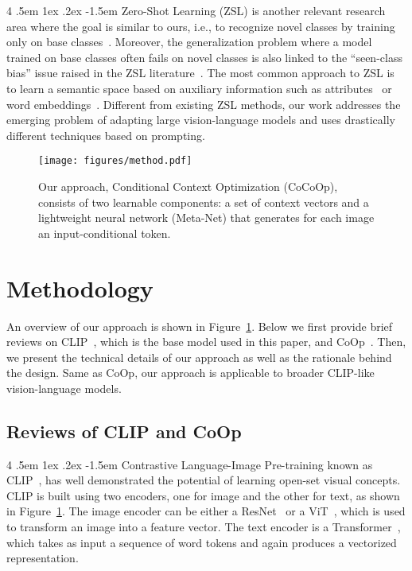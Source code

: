 \documentclass[10pt,twocolumn,letterpaper]{article}
\makeatletter
\renewcommand\paragraph{
  \@startsection{paragraph} {4} {\z@} {.5em \@plus1ex \@minus.2ex} {-1.5em} {\normalfont\normalsize\bfseries} }
\makeatother
\begin{document}
\paragraph{Zero-Shot Learning (ZSL)}
is another relevant research area where the goal is similar to ours, i.e., to recognize novel classes by training only on base classes~\cite{wang2019survey,xian2017zero,chao2016empirical,yi2022exploring}. Moreover, the generalization problem where a model trained on base classes often fails on novel classes is also linked to the ``seen-class bias'' issue raised in the ZSL literature~\cite{xian2017zero}. The most common approach to ZSL is to learn a semantic space based on auxiliary information such as attributes~\cite{huynh2020fine} or word embeddings~\cite{frome2013devise,wang2018zero}. Different from existing ZSL methods, our work addresses the emerging problem of adapting large vision-language models and uses drastically different techniques based on prompting.


\begin{figure}[t]
    \centering
    \texttt{[image: figures/method.pdf]}
    \caption{Our approach, Conditional Context Optimization (CoCoOp), consists of two learnable components: a set of context vectors and a lightweight neural network (Meta-Net) that generates for each image an input-conditional token.}
    \label{fig:method}
\end{figure}


\section{Methodology}
\label{sec:methodology}

An overview of our approach is shown in Figure~\ref{fig:method}. Below we first provide brief reviews on CLIP~\cite{radford2021learning}, which is the base model used in this paper, and CoOp~\cite{zhou2021coop}. Then, we present the technical details of our approach as well as the rationale behind the design. Same as CoOp, our approach is applicable to broader CLIP-like vision-language models.


\subsection{Reviews of CLIP and CoOp}
\paragraph{Contrastive Language-Image Pre-training}
known as CLIP~\cite{radford2019language}, has well demonstrated the potential of learning open-set visual concepts. CLIP is built using two encoders, one for image and the other for text, as shown in Figure~\ref{fig:method}. The image encoder can be either a ResNet~\cite{he2016deep} or a ViT~\cite{dosovitskiy2021image}, which is used to transform an image into a feature vector. The text encoder is a Transformer~\cite{vaswani2017attention}, which takes as input a sequence of word tokens and again produces a vectorized representation.
\end{document}
